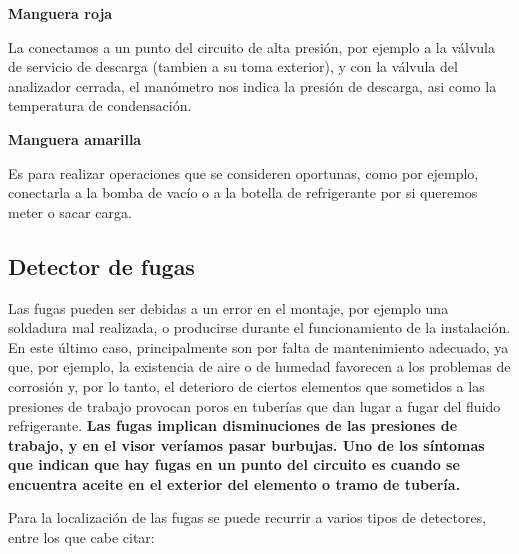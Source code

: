 \textbf{Manguera roja}

La conectamos a un punto del circuito de alta presi\'on, por ejemplo a la v\'alvula de servicio de descarga (tambien a su toma exterior), y con la v\'alvula del analizador cerrada, el man\'ometro nos indica la presi\'on de descarga, asi como la temperatura de condensaci\'on.

\textbf{Manguera amarilla}

Es para realizar operaciones que se consideren oportunas, como por ejemplo, conectarla a la bomba de vac\'io o a la botella de refrigerante por si queremos meter o sacar carga.

\subsection{Detector de fugas}

Las fugas pueden ser debidas a un error en el montaje, por ejemplo una soldadura mal realizada, o producirse durante el funcionamiento de la instalaci\'on. En este \'ultimo caso, principalmente son por falta de mantenimiento adecuado, ya que, por ejemplo, la existencia de aire o de humedad favorecen a los problemas de corrosi\'on y, por lo tanto, el deterioro de ciertos elementos que sometidos a las presiones de trabajo provocan poros en tuber\'ias que dan lugar a fugar del fluido refrigerante. \textbf{Las fugas implican disminuciones de las presiones de trabajo, y en el visor ver\'iamos pasar burbujas. Uno de los s\'intomas que indican que hay fugas en un punto del circuito es cuando se encuentra aceite en el exterior del elemento o tramo de tuber\'ia.}

Para la localizaci\'on de las fugas se puede recurrir a varios tipos de detectores, entre los que cabe citar:

